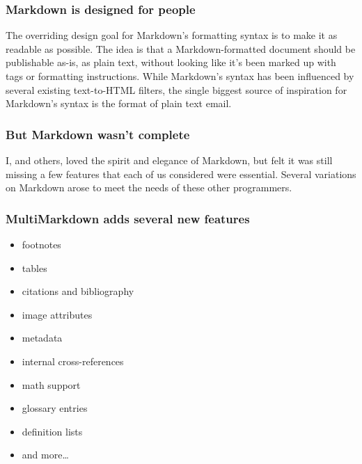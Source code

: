 \begin{frame}

\frametitle{Markdown is designed for people}
\label{markdownisdesignedforpeople}

The overriding design goal for Markdown's formatting syntax is to make it as
readable as possible. The idea is that a Markdown-formatted document should be
publishable as-is, as plain text, without looking like it's been marked up
with tags or formatting instructions. While Markdown's syntax has been
influenced by several existing text-to-HTML filters, the single biggest source
of inspiration for Markdown's syntax is the format of plain text email.
~\citep{Gruber}

\end{frame}

\begin{frame}

\frametitle{But Markdown wasn't complete}
\label{butmarkdownwasntcomplete}

I, and others, loved the spirit and elegance of Markdown, but felt it was
still missing a few features that each of us considered were essential.
Several variations on Markdown arose to meet the needs of these other
programmers.

\end{frame}

\begin{frame}

\frametitle{MultiMarkdown adds several new features}
\label{multimarkdownaddsseveralnewfeatures}

\begin{itemize}
\item footnotes

\item tables

\item citations and bibliography

\item image attributes

\item metadata

\item internal cross-references

\item math support

\item glossary entries

\item definition lists

\item and more{\ldots}

\end{itemize}

\end{frame}

